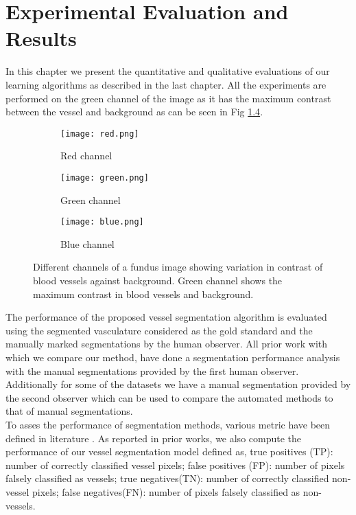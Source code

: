 \chapter{Experimental Evaluation and Results}  %

\ifpdf
\graphicspath{{Chapter4/Figs/Raster/}{Chapter4/Figs/PDF/}{Chapter4/Figs/}}
\else
\graphicspath{{Chapter4/Figs/Vector/}{Chapter4/Figs/}}
\fi

In this chapter we present the quantitative and qualitative evaluations of our learning algorithms as described in the last chapter. All the experiments are performed on the green channel of the image as it has the maximum contrast between the vessel and background as can be seen in Fig \ref{fig:fundus image}.\\
\begin{figure}
	\begin{subfigure}[b]{0.3\textwidth}
		\texttt{[image: red.png]}
		\caption{Red channel}
		\label{fig:red fundus}
	\end{subfigure}
	\begin{subfigure}[b]{0.3\textwidth}
		\texttt{[image: green.png]}
		\caption{Green channel}
		\label{fig:green fundus}
	\end{subfigure}
	\begin{subfigure}[b]{0.3\textwidth}
		\texttt{[image: blue.png]}
		\caption{Blue channel}
		\label{fig:blue fundus}
	\end{subfigure}
	\caption[Red, Green, Blue channels of a fundus image]{Different channels of a fundus image showing variation in contrast of blood vessels against background. Green channel shows the maximum contrast in blood vessels and background.}
	\label{fig:fundus image}
\end{figure}

The performance of the proposed vessel segmentation algorithm is evaluated using the segmented vasculature considered as the gold standard and the manually marked segmentations by the human observer. All prior work with which we compare our method, have done a segmentation performance analysis with the manual segmentations provided by the first human observer. Additionally for some of the datasets we have a manual segmentation provided by the second observer which can be used to compare the automated methods to that of manual segmentations.\\

To asses the performance of segmentation methods, various metric have been defined in literature \cite{monteiro2006performance, sharma2001performance}. As reported in prior works, we also compute the performance of our vessel segmentation model defined as, true positives (TP): number of correctly classified vessel pixels; false positives (FP): number of pixels falsely classified as vessels; true negatives(TN): number of correctly classified non-vessel pixels; false negatives(FN): number of pixels falsely classified as non-vessels.\\

